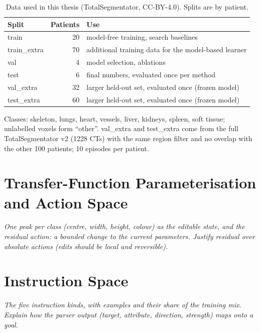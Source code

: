 \documentclass[12pt, a4paper]{book}
\newcommand{\plan}[1]{{\color{gray}\itshape #1\par}}
\begin{document}
\begin{table}[ht]
  \centering
  \caption[Dataset and splits]{Data used in this thesis (TotalSegmentator, CC-BY-4.0). Splits are by patient.}
  \label{tab:task-data}
  \begin{tabular}{lrl}
    \toprule
    Split & Patients & Use \\
    \midrule
    train        & 20 & model-free training, search baselines \\
    train\_extra & 70 & additional training data for the model-based learner \\
    val          &  4 & model selection, ablations \\
    test         &  6 & final numbers, evaluated once per method \\
    \midrule
    val\_extra   & 32 & larger held-out set, evaluated once (frozen model) \\
    test\_extra  & 60 & larger held-out set, evaluated once (frozen model) \\
    \bottomrule
  \end{tabular}

  \medskip
  \small Classes: skeleton, lungs, heart, vessels, liver, kidneys, spleen, soft tissue; unlabelled voxels form ``other''. val\_extra and test\_extra come from the full TotalSegmentator v2 (1228 CTs) with the same region filter and no overlap with the other 100 patients; 10 episodes per patient.
\end{table}

\section{Transfer-Function Parameterisation and Action Space}
\label{sec:task-action}
\plan{One peak per class (centre, width, height, colour) as the editable state, and the residual action: a bounded change to the current parameters. Justify residual over absolute actions (edits should be local and reversible).}

\section{Instruction Space}
\label{sec:task-instructions}
\plan{The five instruction kinds, with examples and their share of the training mix. Explain how the parser output (target, attribute, direction, strength) maps onto a goal.}
\end{document}
